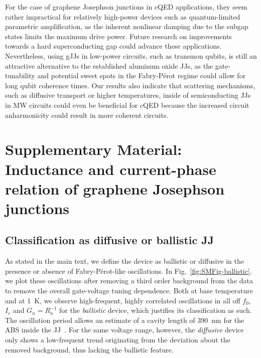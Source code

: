 For the case of graphene Josephson junctions in cQED applications, they seem rather impractical for relatively high-power devices such as quantum-limited parametric amplification, as the inherent nonlinear damping due to the subgap states limits the maximum drive power.
%
Future research on improvements towards a hard superconducting gap could advance these applications.
%
Nevertheless, using gJJs in low-power circuits, such as transmon qubits, is still an attractive alternative to the established aluminum oxide JJs, as the gate-tunability and potential sweet spots in the Fabry-Pérot regime could allow for long qubit coherence times.
%
Our results also indicate that scattering mechanisms, such as diffusive transport or higher temperatures, inside of semiconducting JJs in MW circuits could even be beneficial for cQED because the increased circuit anharmonicity could result in more coherent circuits.


\clearpage
\pagebreak




\section{Supplementary Material: Inductance and current-phase relation of graphene Josephson junctions}\label{sec:SM}

\subsection{Classification as diffusive or ballistic JJ}\label{sec:SMballistic}

As stated in the main text, we define the device as ballistic or diffusive in the presence or absence of Fabry-Pérot-like oscillations.
%
In Fig.~\ref{fig:SMFig-ballistic}, we plot these oscillations after removing a third order background from the data to remove the overall gate-voltage tuning dependence.
%
Both at base temperature and at \SI{1}{\kelvin}, we observe high-frequent, highly correlated oscillations in all off $f_0$, $I_c$ and $G_n=R_n^{-1}$ for the \textit{ballistic} device, which justifies its classification as such.
%
The oscillation period allows an estimate of a cavity length of \SI{390}{\nano\meter} for the ABS inside the JJ~\cite{schmidtBallisticGrapheneSuperconducting2018}.
%
For the same voltage range, however, the \textit{diffusive} device only shows a low-frequent trend originating from the deviation about the removed background, thus lacking the ballistic feature.

